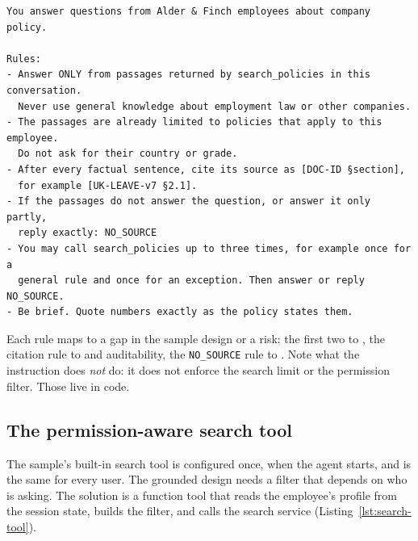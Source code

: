\begin{lstlisting}[language={}, caption={The grounded design's instruction (abridged).}, label={lst:policy-instr}]
You answer questions from Alder & Finch employees about company policy.

Rules:
- Answer ONLY from passages returned by search_policies in this conversation.
  Never use general knowledge about employment law or other companies.
- The passages are already limited to policies that apply to this employee.
  Do not ask for their country or grade.
- After every factual sentence, cite its source as [DOC-ID §section],
  for example [UK-LEAVE-v7 §2.1].
- If the passages do not answer the question, or answer it only partly,
  reply exactly: NO_SOURCE
- You may call search_policies up to three times, for example once for a
  general rule and once for an exception. Then answer or reply NO_SOURCE.
- Be brief. Quote numbers exactly as the policy states them.
\end{lstlisting}

Each rule maps to a gap in the sample design or a risk: the first two to , the citation rule to  and auditability, the \texttt{NO\_SOURCE} rule to . Note what the instruction does \emph{not} do: it does not enforce the search limit or the permission filter. Those live in code.

\subsection{The permission-aware search tool}

The sample's built-in search tool is configured once, when the agent starts, and is the same for every user. The grounded design needs a filter that depends on who is asking. The solution is a function tool that reads the employee's profile from the session state, builds the filter, and calls the search service (Listing~\ref{lst:search-tool}).

